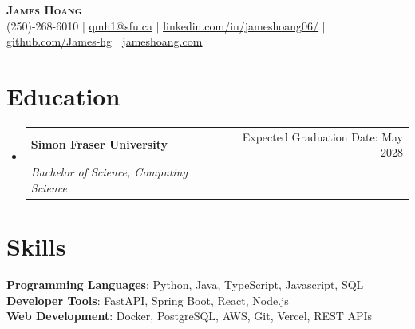 \documentclass[letterpaper, 11pt]{article}
\makeatletter
\newcommand{\resumeSubheading}[4]{
  \vspace{-2pt}\item
    \begin{tabular*}{0.97\textwidth}[t]{l@{\extracolsep{\fill}}r}
      \textbf{#1} & #2 \\
      \textit{\small#3} & \textit{\small #4} \\
    \end{tabular*}\vspace{-7pt}
}
\newcommand{\resumeSubHeadingListStart}{\begin{itemize}[leftmargin=0.15in, label={}]}
\newcommand{\resumeSubHeadingListEnd}{\end{itemize}}
\makeatother
\begin{document}

\begin{center}
    \textbf{\Huge \scshape James Hoang} \\ \vspace{7pt}
    \small (250)-268-6010 $ | $
    \href{mailto:qmh1@sfu.ca}{\underline{qmh1@sfu.ca}} $ | $
    \href{https://www.linkedin.com/in/jameshoang06/}{\underline{\faLinkedin \hspace{1pt} linkedin.com/in/jameshoang06/}} $ | $
    \href{https://github.com/James-hg}{\underline{\faGithub \hspace{1pt} github.com/James-hg}} $ | $
    \href{https://www.jameshoang.com/}{\underline{\faGlobe \hspace{1pt} jameshoang.com}}
\end{center}

\section{Education}
\resumeSubHeadingListStart
\resumeSubheading
{Simon Fraser University}{Expected Graduation Date: May 2028}
{Bachelor of Science, Computing Science}{\textbf{}}
\resumeSubHeadingListEnd

\section{Skills}
\begin{itemize}[leftmargin=0.15in, label={}]
    \small{\item{
          \textbf{Programming Languages}{: Python, Java, TypeScript, Javascript, SQL} \\
          \textbf{Developer Tools}{: FastAPI, Spring Boot, React, Node.js} \\
          \textbf{Web Development}{: Docker, PostgreSQL, AWS, Git, Vercel, REST APIs} \\
          }}
\end{itemize}

\end{document}
